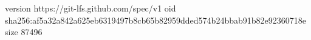 version https://git-lfs.github.com/spec/v1
oid sha256:af5a32a842a625eb6319497b8cb65b82959dded574b24bbab91b82e92360718e
size 87496
